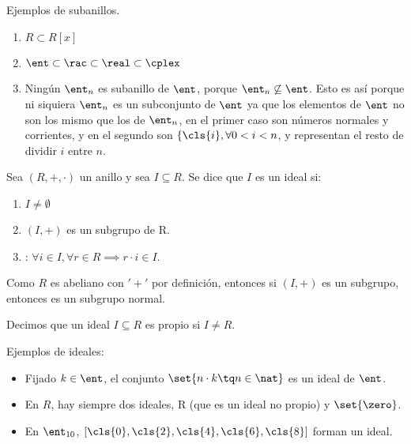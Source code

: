 \begin{example} Ejemplos de subanillos.
	\begin{enumerate}
		\item $R \subset R[x]$
		\item $\ent \subset \rac \subset \real \subset \cplex$
		\item Ningún $\ent_n$ es subanillo de $\ent$, porque $\ent_n \not \subseteq \ent$. Esto es así porque ni siquiera $\ent_n$ es un subconjunto de $\ent$ ya que los elementos de $\ent$ no son los mismo que los de $\ent_n$, en el primer caso son números normales y corrientes, y en el segundo son $\{\cls{i},  \forall 0 < i < n$, y representan el resto de dividir $i$ entre $n$.
	\end{enumerate}
\end{example}


\begin{defn}[Ideal] %
Sea $(R,+,\cdot)$ un anillo y sea $I \subseteq R$. Se dice que $I$ es un ideal si:

	\begin{enumerate}
		\item $I \neq \emptyset$
		\item $(I, +)$ es un subgrupo de R.
		\item {}: $\forall i \in I, \forall r \in R \implies r\cdot i \in I$.
	\end{enumerate}
\end{defn}

\obs Como $R$ es abeliano con  $'+'$ por definición, entonces si $(I,+)$ es un subgrupo, entonces es un subgrupo normal.

\begin{defn}
	Decimos que un ideal $I \subseteq R$ es propio si $I \neq R$.
\end{defn}

\begin{example} Ejemplos de ideales:
	\begin{itemize}
		\item Fijado $k \in \ent$, el conjunto $\set{n\cdot k \tq n \in \nat }$ es un ideal de $\ent$.
		\item En $R$, hay siempre dos ideales, R (que es un ideal no propio) y $\set{\zero}$.
		\item En $\ent_{10}$, $[\cls{0},\cls{2},\cls{4},\cls{6},\cls{8} ]$ forman un ideal.
	\end{itemize}
\end{example}

